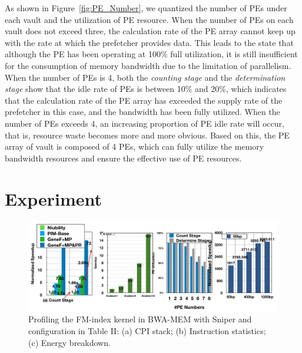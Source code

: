 \documentclass[9pt,conference]{IEEEtran}
\begin{document}
As shown in Figure~\ref{fig:PE_Number}, we quantized the number of PEs under each vault and the utilization of PE resource. When the number of PEs on each vault does not exceed three, the calculation rate of the PE array cannot keep up with the rate at which the prefetcher provides data. This leads to the state that although the PE has been operating at 100\% full utilization, it is still insufficient for the consumption of memory bandwidth due to the limitation of parallelism. When the number of PEs is 4, both the \textit{counting stage} and the \textit{determination stage} show that the idle rate of PEs is between 10\% and 20\%, which indicates that the calculation rate of the PE array has exceeded the supply rate of the prefetcher in this case, and the bandwidth has been fully utilized. When the number of PEs exceeds 4, an increasing proportion of PE idle rate will occur, that is, resource waste becomes more and more obvious. Based on this, the PE array of vault is composed of 4 PEs, which can fully utilize the memory bandwidth resources and ensure the effective use of PE resources.

\section{Experiment}
\begin{figure}[t]
\centering
\includegraphics[scale=0.4]{Conference-LaTeX-template_10-17-19/fig/result.png}
\caption{Profiling the FM-index kernel in BWA-MEM with Sniper and configuration in Table II: (a) CPI stack; (b) Instruction statistics; (c) Energy breakdown.}
\label{fig:data-fm}
\end{figure}
\end{document}
